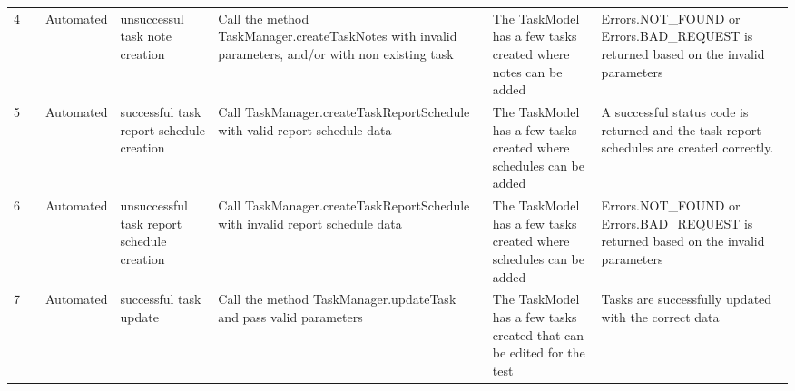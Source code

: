 \documentclass{article}
\begin{document}
{\begin{tabular}{|l|c|l|l|l|l|l|}
    \rowcolor[HTML]{FFFFFF}
    4                                                             & \cellcolor[HTML]{FFFFFF}                                                     & {\color[HTML]{11734B} Automated}                                & unsuccessul task note creation                 & Call the method TaskManager.createTaskNotes with invalid parameters, and/or with non existing task                               & The TaskModel has a few tasks created where notes can be added                                 & Errors.NOT\_FOUND or Errors.BAD\_REQUEST is returned based on the invalid parameters                                          \\ \cline{1-1} \cline{3-7}
    \rowcolor[HTML]{FFFFFF}
    5                                                             & \cellcolor[HTML]{FFFFFF}                                                     & {\color[HTML]{11734B} Automated}                                & successful task report schedule creation       & Call TaskManager.createTaskReportSchedule with valid report schedule data                                                        & The TaskModel has a few tasks created where schedules can be added                             & A successful status code is returned and the task report schedules are created correctly.                                     \\ \cline{1-1} \cline{3-7}
    \rowcolor[HTML]{FFFFFF}
    6                                                             & \cellcolor[HTML]{FFFFFF}                                                     & {\color[HTML]{11734B} Automated}                                & unsuccessful task report schedule creation     & Call TaskManager.createTaskReportSchedule with invalid report schedule data                                                      & The TaskModel has a few tasks created where schedules can be added                             & Errors.NOT\_FOUND or Errors.BAD\_REQUEST is returned based on the invalid parameters                                          \\ \cline{1-1} \cline{3-7}
    \rowcolor[HTML]{FFFFFF}
    7                                                             & \cellcolor[HTML]{FFFFFF}                                                     & {\color[HTML]{11734B} Automated}                                & successful task update                         & Call the method TaskManager.updateTask and pass valid parameters                                                                 & The TaskModel has a few tasks created that can be edited for the test                          & Tasks are successfully updated with the correct data                                                                          \\ \cline{1-1} \cline{3-7}

\end{tabular}}
\end{document}

